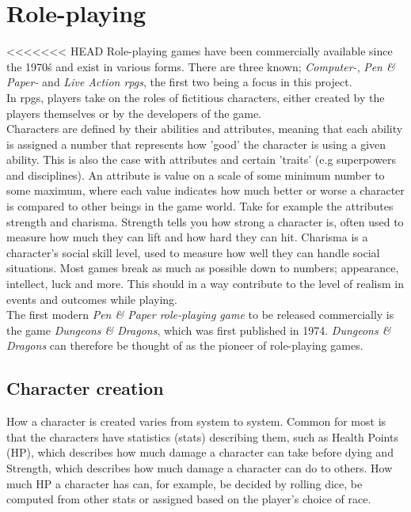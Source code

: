 \section{Role-playing}
<<<<<<< HEAD
Role-playing games have been commercially available since the 1970\'s and exist in various forms.
There are three known; \emph{Computer-}, \emph{Pen \& Paper-} and \emph{Live Action \ac{rpgs}}, the first two being a focus in this project.\\
In \ac{rpgs}, players take on the roles of fictitious characters, either created by the players themselves or by the developers of the game.\\
Characters are defined by their abilities and attributes, meaning that each ability is assigned a number that represents how 'good' the character is using a given ability. This is also the case with attributes and certain 'traits' (e.g superpowers and disciplines). An attribute is value on a scale of some minimum number to some maximum, where each value indicates how much better or worse a character is compared to other beings in the game world. Take for example the attributes strength and charisma. Strength tells you how strong a character is, often used to measure how much they can lift and how hard they can hit. Charisma is a character's social skill level, used to measure how well they can handle social situations. Most games break as much as possible down to numbers; appearance, intellect, luck and more.
This should in a way contribute to the level of realism in events and outcomes while playing.\\
The first modern \emph{Pen \& Paper role-playing game} to be released commercially is the game \emph{Dungeons \& Dragons}, which was first published in 1974.\cite{wikidnd}
\emph{Dungeons \& Dragons} can therefore be thought of as the pioneer of role-playing games.

\subsection{Character creation}

How a character is created varies from system to system. Common for most is that the characters have statistics (stats) describing them, such as Health Points (HP), which describes how much damage a character can take before dying and Strength, which describes how much damage a character can do to others. How much HP a character has can, for example, be decided by rolling dice, be computed from other stats or assigned based on the player's choice of race.

